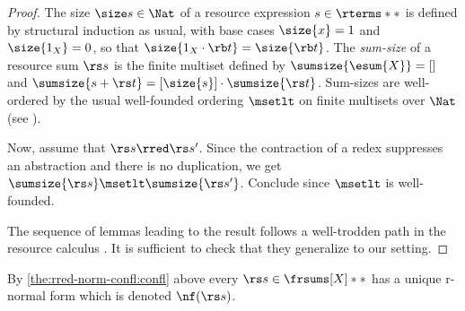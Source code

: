 	\begin{proof}\mbox{}
	\bsub
	\item 
	The size $\size s\in\Nat$ of a resource expression $s\in\rterms**$ 
	is defined by structural induction as usual, 
	with base cases $\size{x} = 1$ and $\size{1_X} = 0$, 
	so that $\size{1_X\cdot \rb t} = \size{\rb t}$.
	The \emph{sum-size} of a resource sum $\rs s$ is 
	the finite multiset defined by $\sumsize{\esum{X}} = []$ and 
	$\sumsize{s+\rs t} = [\size{s}]\cdot \sumsize{\rs t}$.
	Sum-sizes are well-ordered by the usual well-founded ordering 
	$\msetlt$ on finite multisets over $\Nat$ 
	(see \cite[\S A.6]{Terese}).
	
	Now, assume that $\rs s \rred\rs s'$. 
	Since the contraction of a redex suppresses an abstraction 
	and there is no duplication, 
	we get $\sumsize{\rs s}\msetlt \sumsize{\rs s'}$. 
	Conclude since $\msetlt$ is well-founded.
	\item The sequence of lemmas leading to the result follows
	a well-trodden path in the resource calculus \cite{Vaux.19,Cerda.24}.
	It is sufficient to check that they generalize to our setting.
	\qedhere\esub
	\end{proof}

By \eqref{the:rred-norm-confl:confl} above every $\rs s \in \frsums[X]**$ has a unique $\mathrm{r}$-normal form which is denoted $\nf(\rs s)$. 


